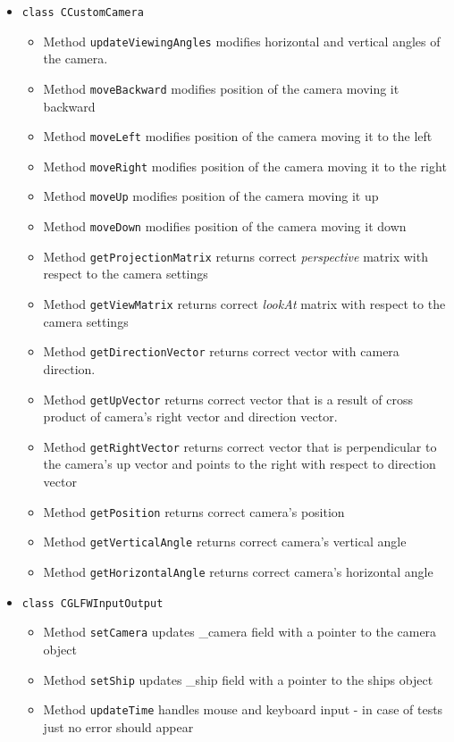\documentclass{report}
\begin{document}
\begin{itemize}
%
%	
\item \texttt{class CCustomCamera}
		\begin{itemize}
			\item Method \texttt{updateViewingAngles} modifies horizontal and vertical angles of the camera.
			\item Method \texttt{moveBackward} modifies position of the camera moving it backward
			\item Method \texttt{moveLeft} modifies position of the camera moving it to the left
			\item Method \texttt{moveRight} modifies position of the camera moving it to the right
			\item Method \texttt{moveUp} modifies position of the camera moving it up
			\item Method \texttt{moveDown} modifies position of the camera moving it down
			\item Method \texttt{getProjectionMatrix} returns correct \textit{perspective} matrix with respect to the camera settings
			\item Method \texttt{getViewMatrix} returns correct \textit{lookAt} matrix with respect to the camera settings
			\item Method \texttt{getDirectionVector} returns correct vector with camera direction.
			\item Method \texttt{getUpVector} returns correct vector that is a result of cross product of camera's right vector and direction vector.
			\item Method \texttt{getRightVector} returns correct vector that is perpendicular to the camera's up vector and points to the right with respect to direction vector
			\item Method \texttt{getPosition} returns correct camera's position
			\item Method \texttt{getVerticalAngle} returns correct camera's vertical angle	
			\item Method \texttt{getHorizontalAngle} returns correct camera's horizontal angle	
		\end{itemize}
%
%	
\item \texttt{class CGLFWInputOutput}
		\begin{itemize}
			\item Method \texttt{setCamera} updates \_camera field with a pointer to the camera object
			\item Method \texttt{setShip} updates \_ship field with a pointer to the ships object		
			\item Method \texttt{updateTime} handles mouse and keyboard input - in case of tests just no error should appear 

\end{itemize}
\end{itemize}
\end{document}
